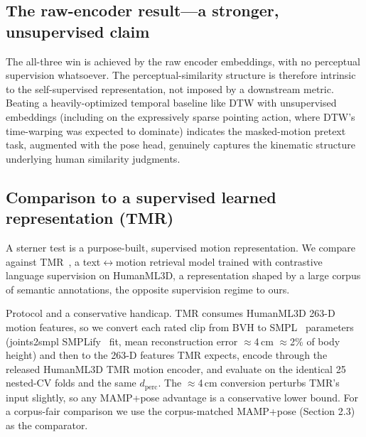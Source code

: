 \documentclass[letterpaper]{article} %
\begin{document}
\subsection{The raw-encoder result---a stronger, unsupervised claim}
The all-three win is achieved by the {raw} encoder embeddings, with no perceptual supervision
whatsoever. The perceptual-similarity structure is therefore {intrinsic to the
self-supervised representation}, not imposed by a downstream metric. Beating a heavily-optimized
temporal baseline like DTW with unsupervised embeddings (including on the expressively sparse
pointing action, where DTW's time-warping was expected to dominate) indicates the masked-motion
pretext task, augmented with the pose head, genuinely captures the kinematic structure underlying
human similarity judgments.

\subsection{Comparison to a supervised learned representation (TMR)}
\label{sec:tmr}
A sterner test is a {purpose-built, supervised} motion representation. We compare against
{TMR}~\citep{petrovich2023tmr}, a text$\leftrightarrow$motion retrieval model trained
with contrastive language supervision on HumanML3D, a representation shaped by a {large}
corpus of semantic annotations, the opposite supervision regime to ours.

{Protocol and a conservative handicap.} TMR consumes HumanML3D 263-D motion features, so we
convert each rated clip from BVH to SMPL~\citep{loper2015smpl} parameters (joints2smpl
SMPLify~\citep{bogo2016smplify} fit, mean reconstruction
error $\approx$4\,cm $\approx$2\% of body height) and then to the 263-D features TMR expects,
encode through the released HumanML3D TMR motion encoder, and evaluate on the {identical 25
nested-CV folds} and the same $d_{\text{perc}}$. The $\approx$4\,cm conversion perturbs TMR's input
slightly, so any MAMP+pose advantage is a {conservative lower bound}. For a corpus-fair
comparison we use the corpus-matched MAMP+pose (Section 2.3) as the comparator.
\end{document}
